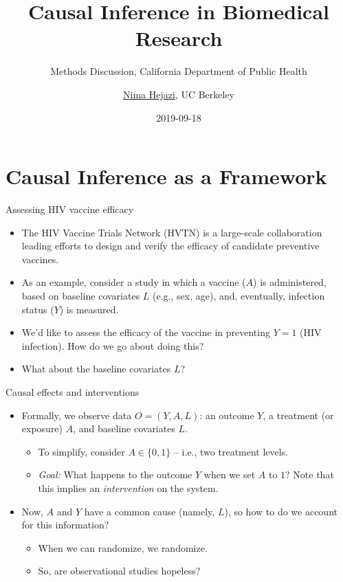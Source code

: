 \documentclass[ignorenonframetext,]{beamer}
\title{Causal Inference in Biomedical Research}
\subtitle{Methods Discussion, California Department of Public Health}
\author{\href{https://nimahejazi.org}{Nima Hejazi}, UC Berkeley}
\date{2019-09-18}
\providecommand{\tightlist}{%
  \setlength{\itemsep}{0pt}\setlength{\parskip}{0pt}}
\begin{document}
\frame{\titlepage}

\begin{frame}
\tableofcontents[hideallsubsections]
\end{frame}
\hypertarget{causal-inference-as-a-framework}{%
\section{Causal Inference as a
Framework}\label{causal-inference-as-a-framework}}

\begin{frame}{Assessing HIV vaccine efficacy}
\protect\hypertarget{assessing-hiv-vaccine-efficacy}{}

\begin{itemize}[<+->]
\tightlist
\item
  The HIV Vaccine Trials Network (HVTN) is a large-scale collaboration
  leading efforts to design and verify the efficacy of candidate
  preventive vaccines.
\item
  As an example, consider a study in which a vaccine (\(A\)) is
  administered, based on baseline covariates \(L\) (e.g., sex, age),
  and, eventually, infection status (\(Y\)) is measured.
\item
  We'd like to assess the efficacy of the vaccine in preventing
  \(Y = 1\) (HIV infection). How do we go about doing this?
\item
  What about the baseline covariates \(L\)?
\end{itemize}

\end{frame}

\begin{frame}{Causal effects and interventions}
\protect\hypertarget{causal-effects-and-interventions}{}

\begin{itemize}[<+->]
\tightlist
\item
  Formally, we observe data \(O = (Y, A, L)\): an outcome \(Y\), a
  treatment (or exposure) \(A\), and baseline covariates \(L\).

  \begin{itemize}[<+->]
  \tightlist
  \item
    To simplify, consider \(A \in \{0, 1\}\) -- i.e., two treatment
    levels.
  \item
    \emph{Goal:} What happens to the outcome \(Y\) when we set \(A\) to
    \(1\)? Note that this implies an \emph{intervention} on the system.
  \end{itemize}
\item
  Now, \(A\) and \(Y\) have a common cause (namely, \(L\)), so how to do
  we account for this information?

  \begin{itemize}[<+->]
  \tightlist
  \item
    When we can randomize, we randomize.
  \item
    So, are observational studies hopeless?
  \end{itemize}
\end{itemize}

\end{frame}
\end{document}
